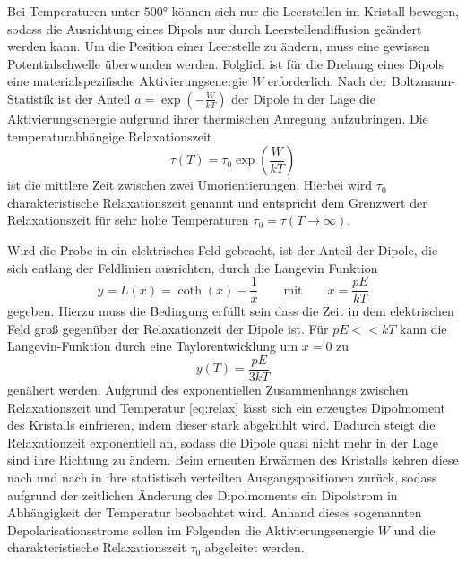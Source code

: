 Bei Temperaturen unter $500°$ können sich nur die Leerstellen im Kristall bewegen, sodass die Ausrichtung eines Dipols nur durch Leerstellendiffusion geändert werden kann.
Um die Position einer Leerstelle zu ändern, muss eine gewissen Potentialschwelle überwunden werden.
Folglich ist für die Drehung eines Dipols eine materialspezifische Aktivierungsenergie $W$ erforderlich.
Nach der Boltzmann-Statistik ist der Anteil ${a=\exp(-\frac{W}{kT})}$ der Dipole in der Lage die Aktivierungsenergie aufgrund ihrer thermischen Anregung aufzubringen.
Die temperaturabhängige Relaxationszeit
\begin{equation}\label{eq:relax}
  \tau(T)=\tau_0\exp\left( \frac{W}{kT}\right )
\end{equation}
ist die mittlere Zeit zwischen zwei Umorientierungen.
Hierbei wird $\tau_0$ charakteristische Relaxationszeit genannt und entspricht dem Grenzwert der Relaxationszeit für sehr hohe Temperaturen $\tau_0 = \tau(T\rightarrow \infty)$.

Wird die Probe in ein elektrisches Feld gebracht, ist der Anteil der Dipole, die sich entlang der Feldlinien ausrichten, durch die Langevin Funktion
\begin{equation}\label{eq:Langevin}
    y = L(x) = \coth(x)-\frac{1}{x} \qquad \text{mit} \qquad x=\frac{pE}{kT}
\end{equation}
gegeben.
Hierzu muss die Bedingung erfüllt sein dass die Zeit in dem elektrischen Feld groß gegenüber der Relaxationzeit der Dipole ist.
Für $pE << kT$ kann die Langevin-Funktion durch eine Taylorentwicklung um $x=0$ zu 
\begin{equation}\label{eq:Langevin2}
    y(T)=\frac{pE}{3kT}
\end{equation}
genähert werden.
Aufgrund des exponentiellen Zusammenhangs zwischen Relaxationszeit und Temperatur \eqref{eq:relax} lässt sich ein erzeugtes Dipolmoment des Kristalls einfrieren, indem dieser stark abgekühlt wird.
Dadurch steigt die Relaxationzeit exponentiell an, sodass die Dipole quasi nicht mehr in der Lage sind ihre Richtung zu ändern.
Beim erneuten Erwärmen des Kristalls kehren diese nach und nach in ihre statistisch verteilten Ausgangspositionen zurück, sodass aufgrund der zeitlichen Änderung des Dipolmoments ein Dipolstrom in Abhängigkeit der Temperatur beobachtet wird.
Anhand dieses sogenannten Depolarisationsstroms sollen im Folgenden die Aktivierungsenergie $W$ und die charakteristische Relaxationszeit $\tau_0$ abgeleitet werden.

